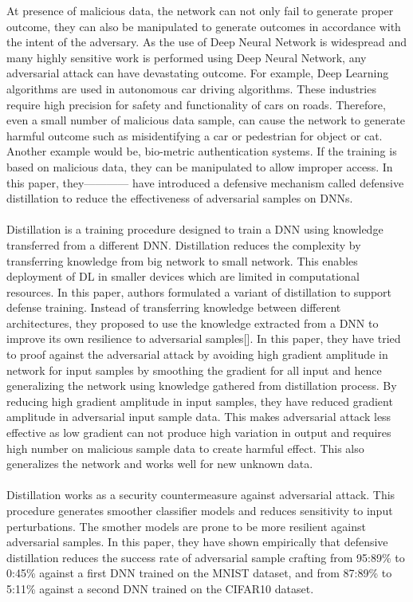 \documentclass[12pt]{article}
\begin{document}
\noindent At presence of malicious data, the network can not only fail to generate proper outcome, they can also be manipulated to generate outcomes in accordance with the intent of the adversary. As the use of Deep Neural Network is widespread and many highly sensitive work is performed using Deep Neural Network, any adversarial attack can have devastating outcome. For example, Deep Learning algorithms are used in autonomous car driving algorithms. These industries require high precision for safety and functionality of cars on roads. Therefore, even a small number of malicious data sample, can cause the network to generate harmful outcome such as misidentifying a car or pedestrian for object or cat. Another example would be, bio-metric authentication systems. If the training is based on malicious data, they can be manipulated to allow improper access.
In this paper, they------------ have introduced a defensive mechanism called defensive distillation to reduce the effectiveness of adversarial samples on DNNs.\\\\
\noindent Distillation is a training procedure designed to train a DNN using knowledge transferred from a different DNN. Distillation reduces the complexity by transferring knowledge from big network to small network. This enables deployment of DL in smaller devices which are limited in computational resources. In this paper, authors formulated a variant of distillation to support defense training.  Instead of transferring knowledge between different architectures, they proposed to use the knowledge extracted from a DNN to improve its own resilience to adversarial samples[]. In this paper, they have tried to proof against the adversarial attack by avoiding high gradient amplitude in network for input samples by smoothing the gradient for all input and hence generalizing the network using knowledge gathered from distillation process. By reducing high gradient amplitude in input samples, they have reduced gradient amplitude in adversarial input sample data. This makes adversarial attack less effective as low gradient can not produce high variation in output and requires high number on malicious sample data to create harmful effect. This also generalizes the network and works well for new unknown data.\\\\
Distillation works as a security countermeasure against adversarial attack. This procedure generates smoother classifier models and reduces sensitivity
to input perturbations. The smother models are prone to be more resilient against adversarial samples. In this paper, they have shown empirically that defensive distillation reduces the success rate of adversarial sample crafting from 95:89\% to 0:45\% against a first DNN trained on the
MNIST dataset, and from 87:89\% to 5:11\% against a second DNN trained on the CIFAR10 dataset\cite{paper}.
\end{document}
